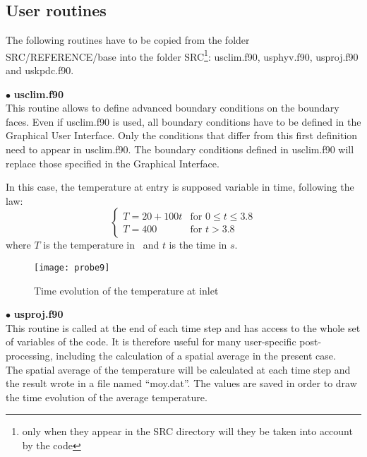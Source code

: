         \subsection{User routines}

The following routines have to be copied from the folder SRC/REFERENCE/base into the
folder SRC\footnote{only when they appear in the SRC directory will they be
taken into account by the code}: usclim.f90, usphyv.f90, usproj.f90 and uskpdc.f90.

$\bullet$ {\bfseries usclim.f90}\\
This routine allows to define advanced boundary conditions on the boundary
faces. Even if usclim.f90 is used, all boundary conditions have to be defined in
the Graphical User Interface. Only the conditions that differ from this first
definition need to appear in usclim.f90. The boundary conditions defined in usclim.f90
will replace those specified in the Graphical Interface.

In this case, the temperature at entry is supposed variable in time, following
the law:
\begin{equation}
\left\{\begin{array}{ll}
T = 20 + 100t & \text{for }0\leqslant t \leqslant 3.8\\
T = 400 & \text{for } t > 3.8
\end{array}\right.
\end{equation}
where $T$ is the temperature in \degresC\ and $t$ is the time in $s$.


\begin{figure}[h!]
\begin{center}
\texttt{[image: probe9]}
\caption{Time evolution of the temperature at inlet}
\label{figp9_e4}
\end{center}
\end{figure}


$\bullet$ {\bfseries usproj.f90}\\
This routine is called at the end of each time step and has access to the whole
set of variables of the code. It is therefore useful for many user-specific
post-processing, including the calculation of a spatial average in the present
case.\\
The spatial average of the temperature will be calculated at each time step and
the result wrote in a file named ``moy.dat''. The values are saved in order
to draw the time evolution of the average temperature.

